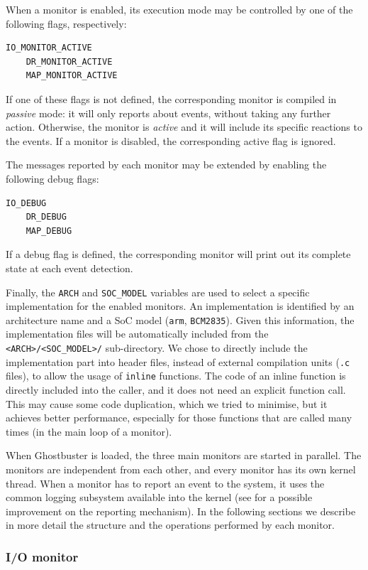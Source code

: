 When a monitor is enabled, its execution mode may be controlled by one of the following flags, respectively:
\begin{Verbatim}[fontsize=\small]
	IO_MONITOR_ACTIVE
	DR_MONITOR_ACTIVE
	MAP_MONITOR_ACTIVE
\end{Verbatim}
If one of these flags is not defined, the corresponding monitor is compiled in \emph{passive} mode: it will only reports about events, without taking any further action.
Otherwise, the monitor is \emph{active} and it will include its specific reactions to the events.
If a monitor is disabled, the corresponding active flag is ignored.

The messages reported by each monitor may be extended by enabling the following debug flags:
\begin{Verbatim}[fontsize=\small]
	IO_DEBUG
	DR_DEBUG
	MAP_DEBUG
\end{Verbatim}
If a debug flag is defined, the corresponding monitor will print out its complete state at each event detection.

Finally, the \verb|ARCH| and \verb|SOC_MODEL| variables are used to select a specific implementation for the enabled monitors.
An implementation is identified by an architecture name and a SoC model (\eg \verb|arm|, \verb|BCM2835|). Given this information,
the implementation files will be automatically included from the \verb|<ARCH>/<SOC_MODEL>/| sub-directory.
We chose to directly include the implementation part into header files, instead of external compilation units (\verb|.c| files), to allow the usage of \verb|inline|
functions. The code of an inline function is directly included into the caller, and it does not need an explicit function call.
This may cause some code duplication, which we tried to minimise, but it achieves better performance,
especially for those functions that are called many times (\eg in the main loop of a monitor).

When Ghostbuster is loaded, the three main monitors are started in parallel.
The monitors are independent from each other, and every monitor has its own kernel thread.
When a monitor has to report an event to the system, it uses the common logging subsystem available into the kernel
(see  for a possible improvement on the reporting mechanism).
In the following sections we describe in more detail the structure and the operations performed by each monitor.


\subsubsection{I/O monitor}

